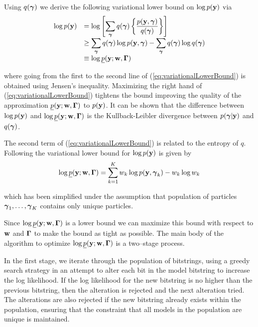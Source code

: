 Using $q({\boldsymbol \gamma})$ we derive the following variational lower bound on $\log p({\bf y})$ via
\begin{equation}
\label{eq:variationalLowerBound}
\begin{array}{rl}
\displaystyle \log p({\bf y}) 
& \displaystyle = \log \left[ \sum_{{\boldsymbol \gamma}} q({\boldsymbol \gamma}) \left\{  \frac{p({\bf y},{\boldsymbol \gamma})}{q({\boldsymbol \gamma}) } \right\} \right]
\\
& \displaystyle \ge \sum_{{\boldsymbol \gamma}} q({\boldsymbol \gamma}) \log p({\bf y},{\boldsymbol \gamma}) 
- \sum_{{\boldsymbol \gamma}} q({\boldsymbol \gamma}) \log q({\boldsymbol \gamma})
\\
& \displaystyle \equiv \log \underline{p}({\bf y};{\bf w},{\boldsymbol \Gamma})
\end{array}
\end{equation}

\noindent where going from the first to the second line of (\ref{eq:variationalLowerBound}) is 
obtained using Jensen's inequality. Maximizing the right hand  of (\ref{eq:variationalLowerBound})
tightens the bound improving the quality of the approximation $\underline{p}({\bf y};{\bf w},{\boldsymbol \Gamma})$ to
$p({\bf y})$. It can be shown that the difference between $\log p({\bf y})$ and 
$\log \underline{p}({\bf y};{\bf w},{\boldsymbol \Gamma})$ is the Kullback-Leibler divergence between $p({\boldsymbol \gamma}|{\bf y})$
and $q({\boldsymbol \gamma})$.

The second term of (\ref{eq:variationalLowerBound})
is related to the entropy of $q$. Following \cite{Rockova2017} 
the variational lower bound for
$\log p({\bf y})$
is given by
\begin{equation}\label{eq:objective}
\displaystyle \log \underline{p}({\bf y};{\bf w},{\boldsymbol \Gamma}) 
= \sum_{k=1}^K w_k\log p({\bf y},{\boldsymbol \gamma}_k) - w_k \log w_k
\end{equation}

\noindent which has been simplified under the assumption that population of particles ${\boldsymbol \gamma}_1,\ldots,{\boldsymbol \gamma}_K$ contains only unique particles.

Since $\log \underline{p}({\bf y};{\bf w},{\boldsymbol \Gamma})$ is a lower
bound we can maximize this bound with respect to ${\bf w}$ 
and ${\boldsymbol \Gamma}$ to make the bound as tight as possible.
The main body of the algorithm to optimize 
$\log \underline{p}({\bf y};{\bf w},{\boldsymbol \Gamma})$ is a two--stage process. 

In the first stage, we iterate through the population of
bitstrings, using a greedy search strategy in an attempt to alter each bit in the model bitstring to increase the log likelihood. If the log likelihood for the new bitstring is no higher than the previous bitstring, then the
alteration is rejected and the next alteration tried. The alterations are also rejected if the new bitstring
already exists within the population, ensuring that the constraint that all models in the population are
unique is maintained.

